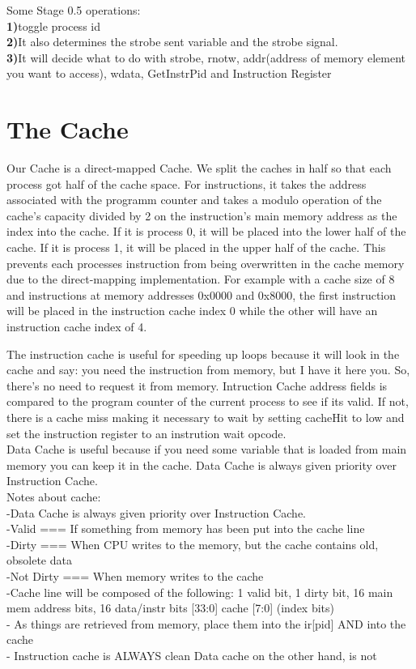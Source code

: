 \documentclass[12pt, twocolumn]{scrartcl}
\begin{document}
Some Stage 0.5 operations: \\
\textbf {1)}toggle process id \\
\textbf {2)}It also determines the strobe sent variable and the strobe signal. \\
\textbf {3)}It will decide what to do with strobe, rnotw, addr(address of memory element you want to access), wdata, GetInstrPid and Instruction Register \\

\section*{The Cache}

Our Cache is a direct-mapped Cache. We split the caches in half so that each process got half of the cache space. For instructions, it takes the address associated with the programm counter and takes a modulo operation of the cache's capacity divided by 2 on the instruction's main memory address as the index into the cache. If it is process 0, it will be placed into the lower half of the cache. If it is process 1, it will be placed in the upper half of the cache. This prevents each processes instruction from being overwritten in the cache memory due to the direct-mapping implementation. For example with a cache size of 8 and instructions at memory addresses 0x0000 and 0x8000, the first instruction will be placed in the instruction cache index 0 while the other will have an instruction cache index of 4. 

The instruction cache is useful for speeding up loops because it will look in the cache and say: you need the instruction from memory, but I have it here you. So, there's no need to request it from memory. Intruction Cache address fields is compared to the program counter of the current process to see if its valid.  If not, there is a cache miss making it necessary to wait by setting cacheHit to low and set the instruction register to an instrution wait opcode. \\

Data Cache is useful because if you need some variable that is loaded from main memory you can keep it in the cache.  Data Cache is always given priority over Instruction Cache.\\

Notes about cache: \\
-Data Cache is always given priority over Instruction Cache. \\
-Valid === If something from memory has been put into the cache line \\
-Dirty === When CPU writes to the memory, but the cache contains old, obsolete data \\
-Not Dirty === When memory writes to the cache \\
-Cache line will be composed of the following: {1 valid bit, 1 dirty bit, 16 main mem address bits, 16 data/instr bits} [33:0] cache [7:0] (index bits) \\
- As things are retrieved from memory, place them into the ir[pid] AND into the cache \\
- Instruction cache is ALWAYS clean Data cache on the other hand, is not \\
\end{document}
